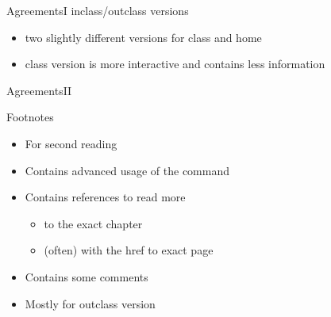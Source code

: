 \begin{frame}{Agreements}{I}\relax
     {\Large inclass/outclass versions}
     \begin{itemize}
          \item two slightly different versions for class and home
          \item class version is more interactive and contains less information
     \end{itemize}
\end{frame}

{\supressfootnotefalse
\begin{frame}[fragile]{Agreements}{II}\relax
\newcommand{\tikzmark}[1]{\tikz[overlay,remember picture] \node (#1) {};}

{ \Large Footnotes }

\begin{itemize}
     \item For second reading
     \item Contains advanced usage of the command 
     \item Contains references to read more 
     \begin{itemize}
         \item to the exact chapter 
         \item (often) with the href to exact page  
     \end{itemize}
     \item Contains some comments
     \item Mostly for outclass version
\end{itemize}
\end{frame}

}

